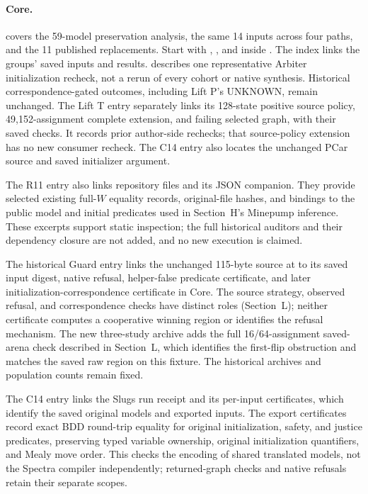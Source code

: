 \paragraph{Core.}
 covers the 59-model
preservation analysis, the same 14 inputs across four paths, and the
11 published replacements. Start with ,
, and  inside
\mbox{}. The index links the groups' saved inputs and results.
 describes one representative Arbiter
initialization recheck, not a rerun of every cohort or native synthesis.
Historical correspondence-gated outcomes, including Lift P's UNKNOWN,
remain unchanged. The Lift T entry separately links its 128-state positive
source policy, 49,152-assignment complete extension, and failing selected
graph, with their saved checks. It records prior author-side rechecks;
that source-policy extension has no new consumer recheck. The C14 entry also locates
the unchanged PCar source and saved initializer argument.

The R11 entry also links repository files
 and its JSON companion.
They provide selected existing full-$W$ equality records, original-file
hashes, and bindings to the public model and initial predicates used in
Section~H's Minepump inference. These excerpts support static inspection;
the full historical auditors and their dependency closure are not added,
and no new execution is claimed.

The historical Guard entry links the unchanged 115-byte source at
 to its saved input digest,
native refusal, helper-false predicate certificate, and later
initialization-correspondence certificate in Core. The source strategy,
observed refusal, and correspondence checks have distinct roles
(Section~L); neither certificate computes a cooperative winning region
or identifies the refusal mechanism. The new three-study archive
adds the full 16/64-assignment saved-arena check described in Section~L,
which identifies the first-flip obstruction and matches the saved raw
region on this fixture. The historical archives and population counts
remain fixed.

The C14 entry links the Slugs run receipt and its per-input certificates,
which identify the saved original models and exported inputs.
The export certificates record exact BDD round-trip equality for original
initialization, safety, and justice predicates, preserving typed variable
ownership, original initialization quantifiers, and Mealy move order.
This checks the encoding of shared translated models, not the Spectra
compiler independently; returned-graph checks and native refusals retain
their separate scopes.

